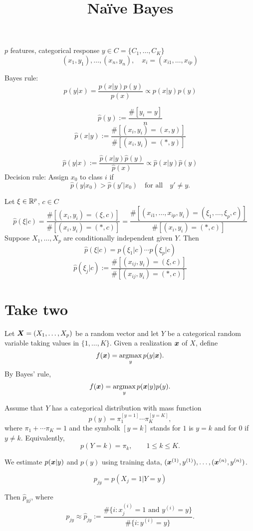 \documentclass[12pt]{amsart}
\begin{document}
\title{Na\"ive Bayes}
\maketitle

$p$ features, categorical response $y\in C=\{C_1,\ldots,C_K\}$
\[
    (x_1, y_1),\ldots,(x_n, y_n),\quad x_i = (x_{i1},\ldots,x_{ip})
\]

Bayes rule:
\[
    p(y|x) = \frac{p(x|y)p(y)}{p(x)} \propto p(x|y)p(y)
\]


\[
    \hat{p}(y) := \frac{\#[y_i=y]}n
\]
\[
    \hat{p}(x|y) := \frac{\#[(x_i,y_i)=(x, y)]}{\#[(x_i,y_i)=(*,y)]}
\]

\[
    \hat{p}(y|x) := \frac{\hat{p}(x|y)\hat{p}(y)}{\hat{p}(x)} \propto \hat{p}(x|y)\hat{p}(y)
\]
Decision rule: Assign $x_0$ to class $i$ if
\[
    \hat{p}(y|x_0) > \hat{p}(y'|x_0)\quad\text{for all}\quad y'\neq y.
\]


Let $\xi\in \mathbb{R}^p$, $c\in C$
\[
    \hat{p}(\xi|c) = \frac{\#[(x_i,y_i)=(\xi, c)]}{\#[(x_i,y_i)=(*,c)]}
    = \frac{\#[(x_{i1},\ldots,x_{ip},y_i)
    =(\xi_1,\ldots,\xi_p, c)]}{\#[(x_i,y_i)=(*,c)]}
\]
Suppose $X_1,\ldots,X_p$ are conditionally independent given $Y$. Then
\[
    \hat{p}(\xi|c) = p(\xi_1|c)\cdots p(\xi_p|c)
\]
\[
    \hat{p}(\xi_j|c) := \frac{\#[(x_{ij},y_i)=(\xi, c)]}{\#[(x_{ij},y_i)=(*,c)]}
\]

\section{Take two}
Let $\boldsymbol{X}=(X_1,\ldots,X_p)$ be a random vector and let 
$Y$ be a categorical random variable taking values in $\{1,\ldots,K\}$.
Given a realization $\boldsymbol{x}$ of $X$, define 
\[
    f(\boldsymbol{x}) = \operatorname*{argmax}_y p(y|\boldsymbol{x}).
\]
By Bayes' rule,
\[f(\boldsymbol{x}) = \operatorname*{argmax}_y p(\boldsymbol{x}|y)p(y).
\]

Assume that $Y$ has a categorical distribution with mass function
\[
    p(y)=\pi_1^{[y=1]}\cdots\pi_K^{[y=K]},
\]
where $\pi_1+\cdots\pi_K=1$
and the symbolk $[y=k]$ stands for $1$ is $y=k$ and for $0$ if $y\neq k$.
Equivalently,
\[
    p(Y=k) = \pi_k,\qquad 1\leq k\leq K.
\]

We estimate $p(\boldsymbol{x}|y)$ and $p(y)$ using training data,
 $(\boldsymbol{x}^{(1)}, y^{(1)}),\ldots, (\boldsymbol{x}^{(n)}, y^{(n)})$.

\[
    p_{jy} = p(X_j=1|Y=y)
\]

Then $ \hat p_{yj}$, where
\[
    p_{jy}\approx \hat p_{jy}
    := \frac{\#\{i : \text{$x^{(i)}_j = 1$ and $y^{(i)}=y$}\}}
    {\#\{i : y^{(i)}=y\}}.
\]
\end{document}
